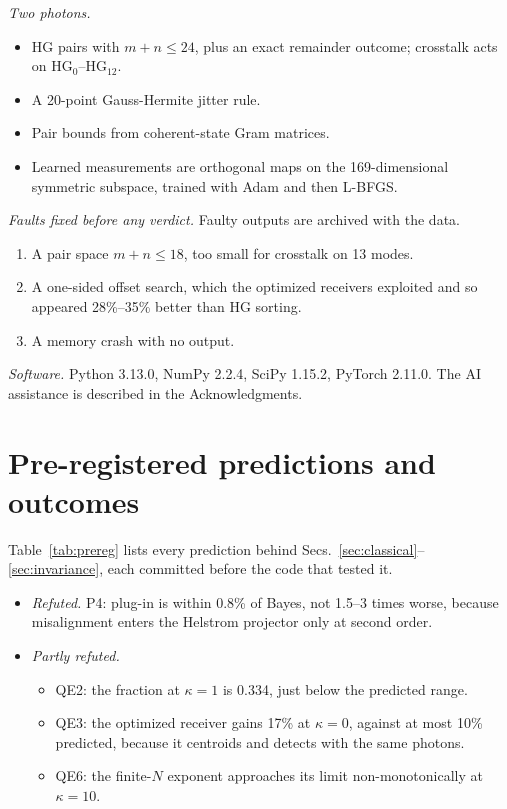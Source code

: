 \emph{Two photons.}
\begin{itemize}
\item HG pairs with $m+n\le24$, plus an exact remainder outcome; crosstalk acts on $\mathrm{HG}_0$--$\mathrm{HG}_{12}$.
\item A 20-point Gauss-Hermite jitter rule.
\item Pair bounds from coherent-state Gram matrices.
\item Learned measurements are orthogonal maps on the 169-dimensional symmetric subspace, trained with Adam and then
  L-BFGS.
\end{itemize}

\emph{Faults fixed before any verdict.} Faulty outputs are archived with the data.
\begin{enumerate}
\item A pair space $m+n\le18$, too small for crosstalk on 13 modes.
\item A one-sided offset search, which the optimized receivers exploited and so appeared 28\%--35\% better than HG
  sorting.
\item A memory crash with no output.
\end{enumerate}

\emph{Software.} Python 3.13.0, NumPy 2.2.4, SciPy 1.15.2, PyTorch 2.11.0. The AI assistance is described in the
Acknowledgments.

\section{Pre-registered predictions and outcomes}
\label{app:prereg}

Table~\ref{tab:prereg} lists every prediction behind Secs.~\ref{sec:classical}--\ref{sec:invariance}, each
committed before the code that tested it.
\begin{itemize}
\item \emph{Refuted.} P4: plug-in is within 0.8\% of Bayes, not 1.5--3 times worse, because misalignment enters the
  Helstrom projector only at second order.
\item \emph{Partly refuted.}
  \begin{itemize}
  \item QE2: the fraction at $\kappa=1$ is 0.334, just below the predicted range.
  \item QE3: the optimized receiver gains 17\% at $\kappa=0$, against at most 10\% predicted, because it centroids
    and detects with the same photons.
  \item QE6: the finite-$N$ exponent approaches its limit non-monotonically at $\kappa=10$.
  \end{itemize}
\end{itemize}

